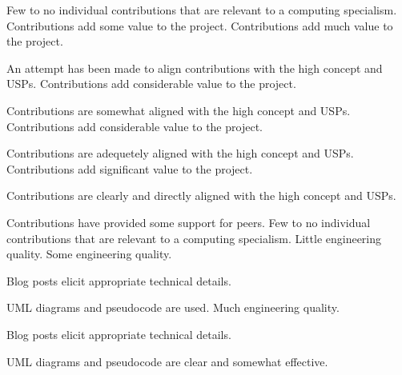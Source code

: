 \documentclass{../../fal_assignment}
\begin{document}
\begin{markingrubric}
%
        \grade\fail Few to no individual contributions that are relevant to a computing specialism.
        \grade Contributions add some value to the project.
        \grade Contributions add much value to the project.
            \par An attempt has been made to align contributions with the high concept and USPs.
        \grade Contributions add considerable value to the project.
            \par Contributions are somewhat aligned with the high concept and USPs.
        \grade Contributions add considerable value to the project.
            \par Contributions are adequetely aligned with the high concept and USPs.
        \grade Contributions add significant value to the project.
            \par Contributions are clearly and directly aligned with the high concept and USPs.
            \par Contributions have provided some support for peers.
%
        \grade\fail Few to no individual contributions that are relevant to a computing specialism.
        \grade Little engineering quality.
        \grade Some engineering quality.
            \par Blog posts elicit appropriate technical details.
            \par UML diagrams and pseudocode are used.
        \grade Much engineering quality.
            \par Blog posts elicit appropriate technical details.
            \par UML diagrams and pseudocode are clear and somewhat effective.

\end{markingrubric}
\end{document}
